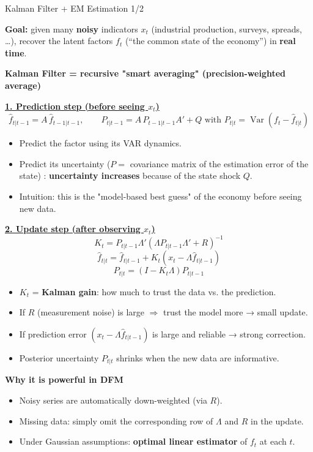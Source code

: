 \documentclass{beamer}
\begin{document}
\begin{frame}[label=kalman-intuition]{Kalman Filter + EM Estimation 1/2}
\scriptsize

\textbf{Goal:} given many \textbf{noisy} indicators $x_t$ (industrial production, surveys, spreads, \dots), recover the latent factors $f_t$ (``the common state of the economy'') in \textbf{real time}.

\medskip

\textbf{Kalman Filter = recursive "smart averaging" (precision-weighted average)}

\medskip

\underline{\textbf{1. Prediction step (before seeing $x_t$)}}  
\tiny
\[
\hat{f}_{t|t-1} = A\, \hat{f}_{t-1|t-1},
\qquad
P_{t|t-1} = A\, P_{t-1|t-1} A' + Q \text{ with } P_{t|t} = \operatorname{Var}(f_t - \hat{f}_{t|t})\]
\begin{itemize}
\tiny
  \item Predict the factor using its VAR dynamics.
  \item Predict its uncertainty ($P=$ covariance matrix of the estimation error of the state) : \textbf{uncertainty increases} because of the state shock $Q$.
  \item Intuition: this is the "model-based best guess" of the economy before seeing new data.
\end{itemize}

\medskip
\scriptsize
\underline{\textbf{2. Update step (after observing $x_t$)}}  
\tiny
\[
K_t = P_{t|t-1} \Lambda' (\Lambda P_{t|t-1} \Lambda' + R)^{-1}
\]
\[
\hat{f}_{t|t} = \hat{f}_{t|t-1} + K_t (x_t - \Lambda \hat{f}_{t|t-1})
\]
\[
P_{t|t} = (I - K_t \Lambda) P_{t|t-1}\]

\begin{itemize}
\tiny
  \item $K_t$ = \textbf{Kalman gain}: how much to trust the data vs. the prediction.
  \item If $R$ (measurement noise) is large $\Rightarrow$ trust the model more → small update.
  \item If prediction error $(x_t - \Lambda\hat{f}_{t|t-1})$ is large and reliable → strong correction.
  \item Posterior uncertainty $P_{t|t}$ shrinks when the new data are informative.
\end{itemize}

\medskip

\scriptsize
\textbf{Why it is powerful in DFM}
\begin{itemize}
\tiny
  \item Noisy series are automatically down-weighted (via $R$).  
  \item Missing data: simply omit the corresponding row of $\Lambda$ and $R$ in the update.  
  \item Under Gaussian assumptions: \textbf{optimal linear estimator} of $f_t$ at each $t$.
\end{itemize}

\end{frame}
\end{document}
